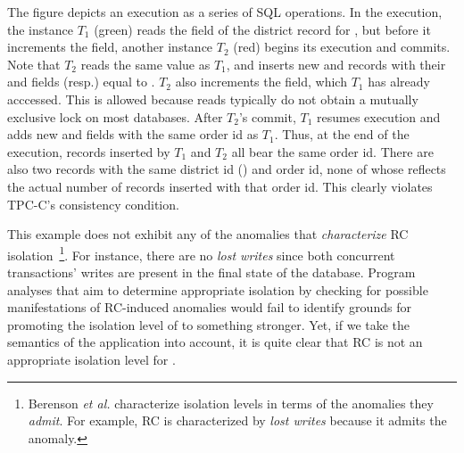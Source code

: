 
The figure depicts an execution as a series of SQL operations. In the
execution, the  instance $T_1$ (green) reads the
 field of the district record for , but
before it increments the field, another  instance
$T_2$ (red) begins its execution and commits. Note that $T_2$ reads the
same  value as $T_1$, and inserts new  and
 records with their  and  fields
(resp.) equal to . $T_2$ also increments the
 field, which $T_1$ has already acccessed. This is
allowed because reads typically do not obtain a mutually exclusive
lock on most databases. After $T_2$'s commit, $T_1$ resumes execution
and adds new  and  fields with the same order
id as $T_1$. Thus, at the end of the execution, 
records inserted by $T_1$ and $T_2$ all bear the same order id. There
are also two  records with the same district id ()
and order id, none of whose  reflects the actual number
of  records inserted with that order id.  This clearly
violates TPC-C's consistency condition.

This example does not exhibit any of the anomalies that
\emph{characterize} RC isolation~\cite{berenson}\footnote{Berenson
\emph{et al.} characterize isolation levels in terms of the anomalies
they \emph{admit}. For example, RC is characterized by \emph{lost
writes} because it admits the anomaly.}. For instance, there are no
\emph{lost writes} since both concurrent transactions' writes are
present in the final state of the database.  Program analyses that aim
to determine appropriate isolation by checking for possible
manifestations of RC-induced anomalies would fail to identify grounds
for promoting the isolation level of  to something
stronger.  Yet, if we take the semantics of the application into
account, it is quite clear that RC is not an appropriate isolation
level for .

